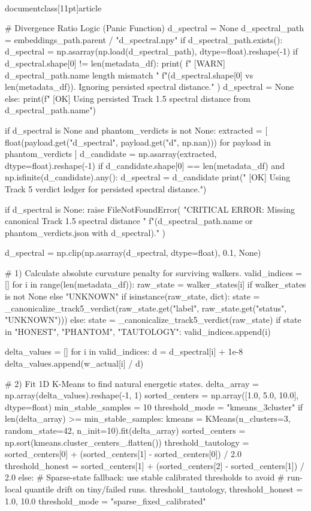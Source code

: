 \\documentclass[11pt]{article}
\begin{document}
\begin{CodeBlock}
    # Divergence Ratio Logic (Panic Function)
    d_spectral = None
    d_spectral_path = embeddings_path.parent / "d_spectral.npy"
    if d_spectral_path.exists():
        d_spectral = np.asarray(np.load(d_spectral_path), dtype=float).reshape(-1)
        if d_spectral.shape[0] != len(metadata_df):
            print(
                f"  [WARN] {d_spectral_path.name} length mismatch "
                f"({d_spectral.shape[0]} vs {len(metadata_df)}). Ignoring persisted spectral distance."
            )
            d_spectral = None
        else:
            print(f"  [OK] Using persisted Track 1.5 spectral distance from {d_spectral_path.name}")

    if d_spectral is None and phantom_verdicts is not None:
        extracted = [
            float(payload.get("d_spectral", payload.get("d", np.nan)))
            for payload in phantom_verdicts
        ]
        d_candidate = np.asarray(extracted, dtype=float).reshape(-1)
        if d_candidate.shape[0] == len(metadata_df) and np.isfinite(d_candidate).any():
            d_spectral = d_candidate
            print("  [OK] Using Track 5 verdict ledger for persisted spectral distance.")

    if d_spectral is None:
        raise FileNotFoundError(
            "CRITICAL ERROR: Missing canonical Track 1.5 spectral distance "
            f"({d_spectral_path.name} or phantom_verdicts.json with d_spectral)."
        )

    d_spectral = np.clip(np.asarray(d_spectral, dtype=float), 0.1, None)

    # 1) Calculate absolute curvature penalty for surviving walkers.
    valid_indices = []
    for i in range(len(metadata_df)):
        raw_state = walker_states[i] if walker_states is not None else "UNKNOWN"
        if isinstance(raw_state, dict):
            state = _canonicalize_track5_verdict(raw_state.get("label", raw_state.get("status", "UNKNOWN")))
        else:
            state = _canonicalize_track5_verdict(raw_state)
        if state in {"HONEST", "PHANTOM", "TAUTOLOGY"}:
            valid_indices.append(i)

    delta_values = []
    for i in valid_indices:
        d = d_spectral[i] + 1e-8
        delta_values.append(w_actual[i] / d)

    # 2) Fit 1D K-Means to find natural energetic states.
    delta_array = np.array(delta_values).reshape(-1, 1)
    sorted_centers = np.array([1.0, 5.0, 10.0], dtype=float)
    min_stable_samples = 10
    threshold_mode = "kmeans_3cluster"
    if len(delta_array) >= min_stable_samples:
        kmeans = KMeans(n_clusters=3, random_state=42, n_init=10).fit(delta_array)
        sorted_centers = np.sort(kmeans.cluster_centers_.flatten())
        threshold_tautology = sorted_centers[0] + (sorted_centers[1] - sorted_centers[0]) / 2.0
        threshold_honest = sorted_centers[1] + (sorted_centers[2] - sorted_centers[1]) / 2.0
    else:
        # Sparse-state fallback: use stable calibrated thresholds to avoid
        # run-local quantile drift on tiny/failed runs.
        threshold_tautology, threshold_honest = 1.0, 10.0
        threshold_mode = "sparse_fixed_calibrated"


\end{CodeBlock}
\end{document}
